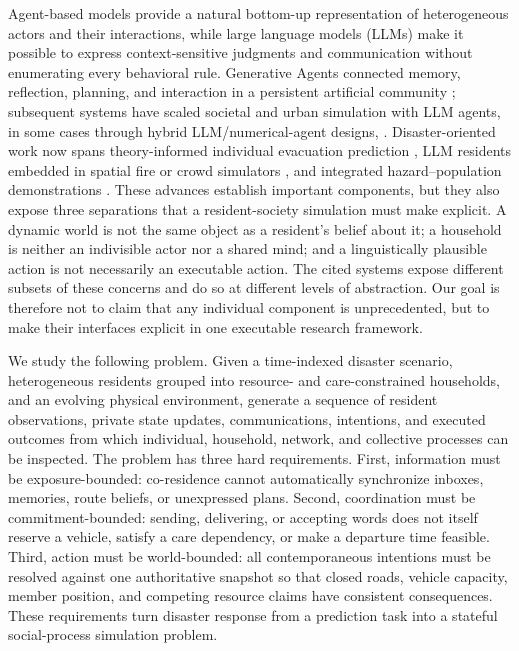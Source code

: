 \documentclass[journal]{IEEEtran}
\begin{document}
Agent-based models provide a natural bottom-up representation of heterogeneous
actors and their interactions, while large language models (LLMs) make it
possible to express context-sensitive judgments and communication without
enumerating every behavioral rule. Generative Agents connected memory,
reflection, planning, and interaction in a persistent artificial community
\cite{park2023generativeagents}; subsequent systems have scaled societal and
urban simulation with LLM agents, in some cases through hybrid
LLM/numerical-agent designs,
\cite{zhang2025agentsociety,bougie2025citysim,zhou2026gasim}. Disaster-oriented
work now spans theory-informed individual evacuation prediction
\cite{chen2025flare}, LLM residents embedded in spatial fire or crowd simulators
\cite{dang2025fireagents,yang2026whenagents}, and integrated hazard--population
demonstrations \cite{sultimov2026respond}. These advances establish important
components, but they also expose three separations that a resident-society
simulation must make explicit. A dynamic world is not the same object as a
resident's belief about it; a household is neither an indivisible actor nor a
shared mind; and a linguistically plausible action is not necessarily an
executable action. The cited systems expose different subsets of these concerns
and do so at different levels of abstraction. Our goal is therefore not to
claim that any individual component is unprecedented, but to make their
interfaces explicit in one executable research framework.

We study the following problem. Given a time-indexed disaster scenario,
heterogeneous residents grouped into resource- and care-constrained households,
and an evolving physical environment, generate a sequence of resident
observations, private state updates, communications, intentions, and executed
outcomes from which individual, household, network, and collective processes can
be inspected. The problem has three hard requirements. First, information must
be exposure-bounded: co-residence cannot automatically synchronize inboxes,
memories, route beliefs, or unexpressed plans. Second, coordination must be
commitment-bounded: sending, delivering, or accepting words does not itself
reserve a vehicle, satisfy a care dependency, or make a departure time feasible.
Third, action must be world-bounded: all contemporaneous intentions must be
resolved against one authoritative snapshot so that closed roads, vehicle
capacity, member position, and competing resource claims have consistent
consequences. These requirements turn disaster response from a prediction task
into a stateful social-process simulation problem.
\end{document}
